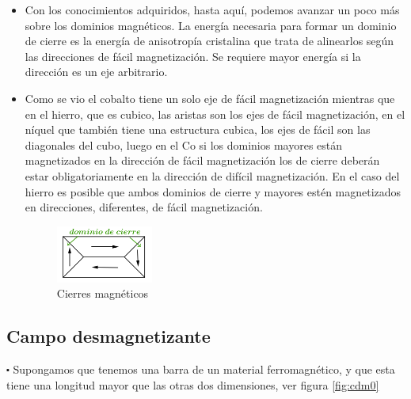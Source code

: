 \begin{itemize}
	\item Con los conocimientos adquiridos, hasta aquí, podemos avanzar un poco más sobre los dominios
magnéticos. La energía necesaria para formar un dominio de cierre es la energía de anisotropía
cristalina que trata de alinearlos según las direcciones de fácil magnetización. Se requiere mayor energía si la dirección es un eje arbitrario.

	\item Como se vio el cobalto tiene un solo eje de fácil magnetización mientras que en el hierro, que es cubico, las aristas son los ejes de fácil magnetización, en el níquel que también tiene una estructura cubica, los ejes de fácil son las diagonales del cubo, luego en el Co si los dominios mayores están magnetizados en la dirección de fácil magnetización los de cierre deberán estar obligatoriamente en la dirección de difícil magnetización. En el caso del hierro es posible que ambos dominios de cierre y mayores estén magnetizados en direcciones, diferentes, de fácil magnetización.
	
	\begin{figure}[H]
    \centering
    \includegraphics[width=0.3\textwidth]{./Figures/cierre}
	\caption{Cierres magnéticos}
	\label{fig:cierre}
	\end{figure}

\end{itemize}


\subsection{Campo desmagnetizante}
$\centerdot$ Supongamos que tenemos una barra de un material ferromagnético, y que esta tiene una longitud mayor que las otras dos dimensiones, ver figura \ref{fig:cdm0}


